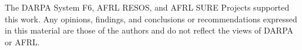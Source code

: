 The DARPA System F6, AFRL RESOS, and AFRL SURE Projects supported
this work. Any opinions, findings, and conclusions or recommendations expressed
in this material are those of the authors and do not reflect the views of
DARPA or AFRL. 

